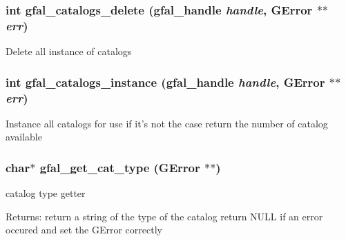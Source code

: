 \subsubsection{\setlength{\rightskip}{0pt plus 5cm}int gfal\_\-catalogs\_\-delete (gfal\_\-handle {\em handle}, GError $\ast$$\ast$ {\em err})}\label{gfal__common__catalog_8c_c0412247b6ddd6ceac7fb171c56adaad}


Delete all instance of catalogs 
\subsubsection{\setlength{\rightskip}{0pt plus 5cm}int gfal\_\-catalogs\_\-instance (gfal\_\-handle {\em handle}, GError $\ast$$\ast$ {\em err})}\label{gfal__common__catalog_8c_96ebd098ad2447a81f096207879b9d3a}


Instance all catalogs for use if it's not the case return the number of catalog available 
\subsubsection{\setlength{\rightskip}{0pt plus 5cm}char$\ast$ gfal\_\-get\_\-cat\_\-type (GError $\ast$$\ast$)}\label{gfal__common__catalog_8c_c20aa1a376c802d0c60208854537851e}


catalog type getter 

\begin{Desc}
\item[Returns:]return a string of the type of the catalog return NULL if an error occured and set the GError correctly \end{Desc}
